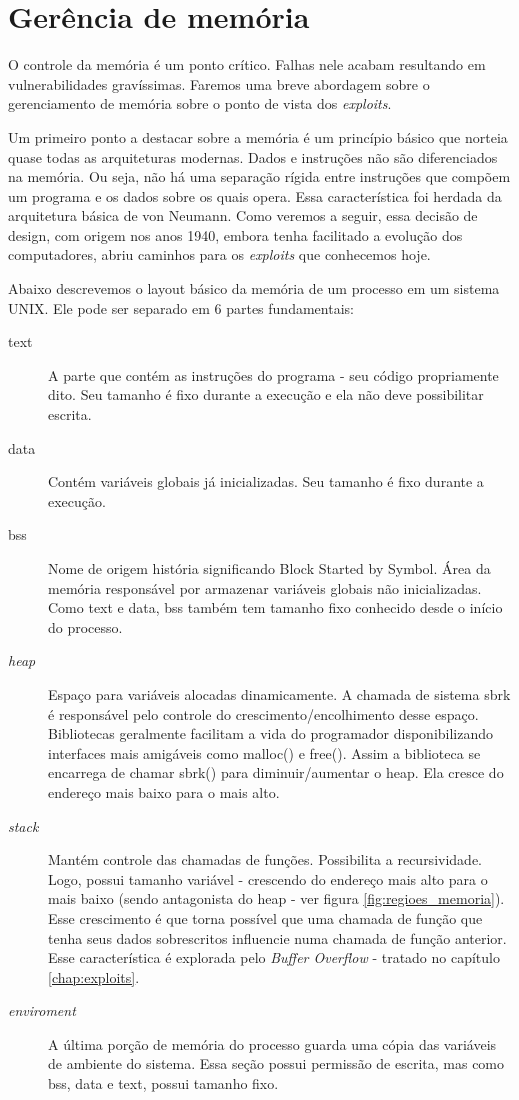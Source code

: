 	\section{Gerência de memória}
	\label{sec:gerencia_memoria}
	O controle da memória é um ponto crítico. Falhas nele acabam resultando em vulnerabilidades 
	gravíssimas. Faremos uma breve abordagem sobre o gerenciamento de memória sobre
	o ponto de vista dos \textsl{exploits}.

	Um primeiro ponto a destacar sobre a memória é um princípio básico que norteia
	quase todas as arquiteturas modernas. Dados e instruções não são diferenciados na memória.
	Ou seja, não há uma separação rígida entre instruções que compõem um programa e os dados
	sobre os quais opera. Essa característica foi herdada da arquitetura básica de von Neumann.
	Como veremos a seguir, essa decisão de design, com origem nos anos 1940, embora tenha
	facilitado a evolução dos computadores, abriu caminhos para os \textsl{exploits} que conhecemos hoje. 

	Abaixo descrevemos o layout básico da memória de um processo em um sistema UNIX.
	Ele pode ser separado em 6 partes fundamentais:
	\begin{description}
		\item[text]
			A parte que contém as instruções do programa - seu código propriamente dito.
			Seu tamanho é fixo durante a execução e ela não deve possibilitar escrita.
		\item[data]
			Contém variáveis globais já inicializadas. Seu tamanho é fixo durante a execução.
		\item[bss]
			Nome de origem história significando Block Started by Symbol. Área da memória responsável
			por armazenar variáveis globais	não inicializadas. Como text e data, bss também tem tamanho 
			fixo conhecido desde o início do processo. 
		\item[\textsl{heap}]
			Espaço para variáveis alocadas dinamicamente. A chamada de sistema sbrk é responsável
			pelo controle do crescimento/encolhimento desse espaço. Bibliotecas geralmente facilitam a vida
			do programador disponibilizando interfaces mais amigáveis como malloc() e free(). Assim a biblioteca
			se encarrega de chamar sbrk() para diminuir/aumentar o heap. Ela cresce do endereço mais baixo para o
			mais alto.
		\item[\textsl{stack}]
			Mantém controle das chamadas de funções. Possibilita a recursividade. Logo, possui
			tamanho variável - crescendo do endereço mais alto para o mais baixo (sendo antagonista do heap - ver
			figura \ref{fig:regioes_memoria}). 
			Esse crescimento é que torna possível que uma chamada de função que tenha seus dados
			sobrescritos influencie numa chamada de função anterior. Esse característica é explorada
			pelo \textsl{Buffer Overflow} - tratado no capítulo \ref{chap:exploits}.
		\item[\textsl{enviroment}]
			A última porção de memória do processo guarda uma cópia das variáveis de ambiente do sistema.
			Essa seção possui permissão de escrita, mas como bss, data e text, possui tamanho fixo.
	\end{description}

